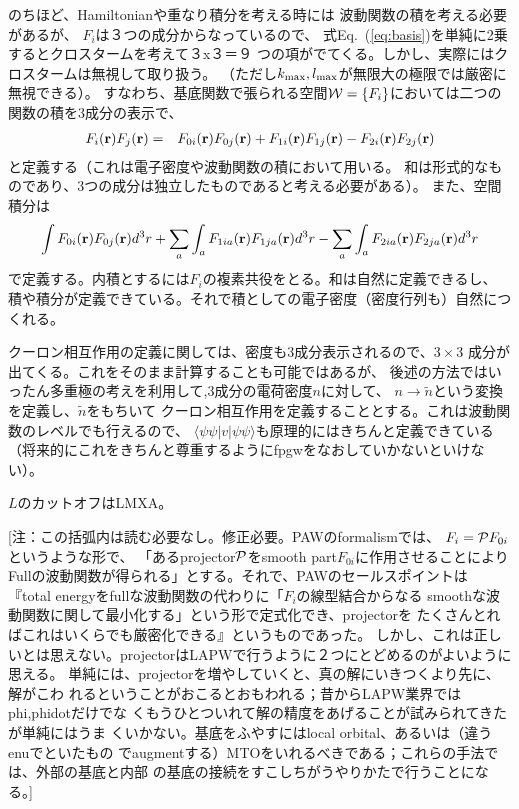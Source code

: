\documentclass[a4paper,10pt,aip,onecolumn,amsmath,amssymb,floatfix,rmp]{revtex4-1}
\newcommand{\bfr}{{\bf r}}
\newcommand{\req}[1]{\mbox{Eq.~\!(\ref{#1})}}
\begin{document}

のちほど、Hamiltonianや重なり積分を考える時には
波動関数の積を考える必要があるが、
$F_i$は３つの成分からなっているので、
式\req{eq:basis}を単純に2乗するとクロスタームを考えて３x３＝９
つの項がでてくる。しかし、実際にはクロスタームは無視して取り扱う。
（ただし$k_{\rm max},l_{\rm max}$が無限大の極限では厳密に無視できる）。
すなわち、基底関数で張られる空間${\cal W}=\{ F_i \}$においては二つの関数の積を3成分の表示で、
\begin{eqnarray}
F_i(\bfr) F_j (\bfr)
&=& F_{0i}(\bfr) F_{0j}(\bfr)+ F_{1i}(\bfr)F_{1j}(\bfr)-
F_{2i}(\bfr)F_{2j}(\bfr)
\label{eq:product}
\end{eqnarray}と定義する（これは電子密度や波動関数の積において用いる。
和は形式的なものであり、3つの成分は独立したものであると考える必要がある）。
また、空間積分は
\begin{eqnarray}
\int F_{0i}(\bfr) F_{0j}(\bfr) d^3r 
+\sum_a \int_a F_{1ia}(\bfr) F_{1ja}(\bfr) d^3r
-\sum_a \int_a F_{2ia}(\bfr) F_{2ja}(\bfr) d^3r
\end{eqnarray}
で定義する。内積とするには$F_i$の複素共役をとる。和は自然に定義できるし、
積や積分が定義できている。それで積としての電子密度（密度行列も）自然につくれる。

クーロン相互作用の定義に関しては、密度も3成分表示されるので、$3\times3$
成分が出てくる。これをそのまま計算することも可能ではあるが、
後述の方法ではいったん多重極の考えを利用して,3成分の電荷密度$n$に対して、
$n\rightarrow \tilde{n}$という変換を定義し、$\tilde{n}$をもちいて
クーロン相互作用を定義することとする。これは波動関数のレベルでも行えるので、
$\langle \psi \psi |v| \psi \psi \rangle$も原理的にはきちんと定義できている
（将来的にこれをきちんと尊重するようにfpgwをなおしていかないといけない）。

$L$のカットオフはLMXA。

{\small [\noindent 注：この括弧内は読む必要なし。修正必要。PAWのformalismでは、
${F}_i={\cal P}F_{0i}$というような形で、
「あるprojector${\cal P}$をsmooth part$F_{0i}$に作用させることにより
Fullの波動関数が得られる」とする。それで、PAWのセールスポイントは
『total energyをfullな波動関数の代わりに「$F_i$の線型結合からなる
smoothな波動関数に関して最小化する」という形で定式化でき、projectorを
たくさんとればこれはいくらでも厳密化できる』というものであった。
しかし、これは正しいとは思えない。projectorはLAPWで行うように２つにとどめるのがよいように思える。
単純には、projectorを増やしていくと、真の解にいきつくより先に、解がこわ
れるということがおこるとおもわれる；昔からLAPW業界ではphi,phidotだけでな
くもうひとついれて解の精度をあげることが試みられてきたが単純にはうま
くいかない。基底をふやすにはlocal orbital、あるいは（違うenuでといたもの
でaugmentする）MTOをいれるべきである；これらの手法では、外部の基底と内部
の基底の接続をすこしちがうやりかたで行うことになる。]}\\
\end{document}
